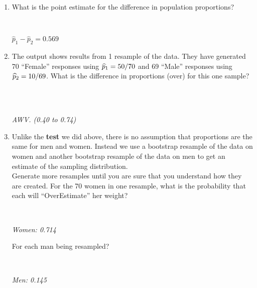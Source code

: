 \begin{enumerate}
    \begin{enumerate}
      \item    \label{phatDiff} What is the point estimate for the
       difference in population    proportions? 
\begin{students}
 \ \   \vspace*{1cm}\\
\end{students}
\begin{key}
   $\widehat{p}_1  - \widehat{p}_2 =    0.569$
\end{key}
\item The output shows results from 1 resample of the data.
       They have generated  70 ``Female'' responses using $\widehat{p}_1 =
       50/70$ and 69 ``Male'' responses using $\widehat{p}_2 = 10/69$. What
       is the difference in proportions (over) for this one sample?
\begin{students}
 \ \   \vspace*{1cm}\\
\end{students}
\begin{key}
   \\ {\it AWV. (0.40 to 0.74) }  
\end{key}
       \item  Unlike the {\bf test} we did above, there is no assumption
         that proportions are the same for men and women.  Instead we
         use a bootstrap resample of the data on women and another bootstrap
         resample of the data on men to get an estimate of the
         sampling distribution. 
            \\  Generate more resamples until you are sure that you
            understand how they are created. For the 70 women in one
            resample, what is the probability that each will 
            ``OverEstimate'' her weight? 
\begin{students}
 \ \   \vspace*{1cm}\\
\end{students}
\begin{key}
  {\it Women: 0.714}\\
\end{key}  For each man being resampled? 
\begin{students}
 \ \   \vspace*{1cm}\\
\end{students}
\begin{key}
  {\it  Men: 0.145}\\

\end{key}
\end{enumerate}
\end{enumerate}
